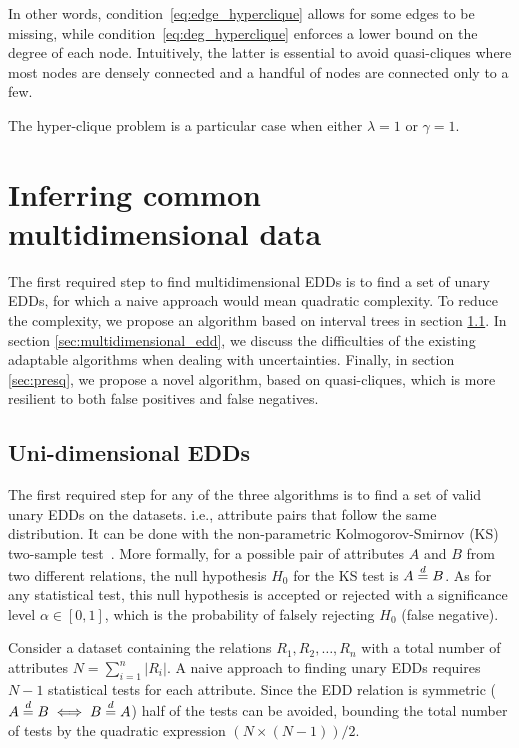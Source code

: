 In other words, condition~\ref{eq:edge_hyperclique} allows for some edges to be missing,
while condition~\ref{eq:deg_hyperclique} enforces a lower bound on the degree of each
node. Intuitively, the latter is essential to avoid quasi-cliques where most nodes
are densely connected and a handful of nodes are connected only to a few.

The hyper-clique problem is a particular case when either $\lambda = 1$ or $\gamma = 1$.



\section{Inferring common multidimensional data}
\label{sec:inferring}

The first required step to find multidimensional EDDs is to
find a set of unary EDDs, for which a naive approach would
mean quadratic complexity. To reduce the complexity, we
propose an algorithm based on interval trees in
section \ref{sec:unary}. In section
\ref{sec:multidimensional_edd}, we discuss the
difficulties of the existing adaptable algorithms
when dealing with uncertainties. Finally, in section
\ref{sec:presq}, we propose a novel algorithm, based on 
quasi-cliques, which is more resilient to both false positives
and false negatives.

\subsection{Uni-dimensional EDDs}
\label{sec:unary}

The first required step for any of the three algorithms is to find a set of valid unary
EDDs on the datasets. i.e., attribute pairs that follow
the same distribution. It can be done with the non-parametric
Kolmogorov-Smirnov (KS) two-sample test~\cite{Hodges1958}.
More formally, for a possible pair of attributes $A$ and $B$ from two different relations,
the null hypothesis $H_0$ for the KS test is $A \stackrel{d}{=} B$. As for any statistical test,
this null hypothesis is accepted or rejected with a significance level $\alpha \in [0,1]$,
which is the probability of falsely rejecting $H_0$ (false negative).

Consider a dataset containing the relations $R_1,R_2,\ldots,R_n$ with a total number of
attributes $N = \sum_{i=1}^n |R_i|$. A naive approach to finding unary EDDs requires $N - 1$
statistical tests for each attribute. Since the EDD relation is symmetric
($A \stackrel{d}{=} B \iff B \stackrel{d}{=} A$) half of the tests can be avoided, bounding the total number
of tests by the quadratic expression $(N \times (N - 1)) / 2$.

